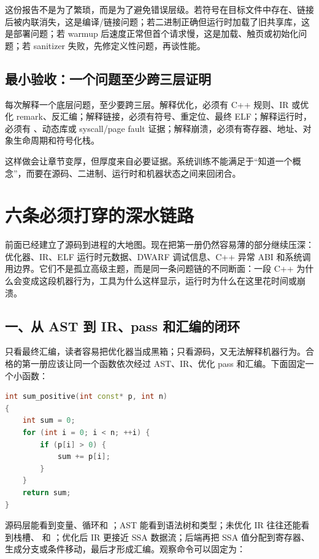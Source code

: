 这份报告不是为了繁琐，而是为了避免错误层级。若符号在目标文件中存在、链接后被内联消失，这是编译/链接问题；若二进制正确但运行时加载了旧共享库，这是部署问题；若 warmup 后速度正常但首个请求慢，这是加载、触页或初始化问题；若 sanitizer 失败，先修定义性问题，再谈性能。

\subsection{最小验收：一个问题至少跨三层证明}

每次解释一个底层问题，至少要跨三层。解释优化，必须有 C++ 规则、IR 或优化 remark、反汇编；解释链接，必须有符号、重定位、最终 ELF；解释运行时，必须有 、动态库或 syscall/page fault 证据；解释崩溃，必须有寄存器、地址、对象生命周期和符号化栈。

这样做会让章节变厚，但厚度来自必要证据。系统训练不能满足于“知道一个概念”，而要在源码、二进制、运行时和机器状态之间来回闭合。

\section{六条必须打穿的深水链路}

前面已经建立了源码到进程的大地图。现在把第一册仍然容易薄的部分继续压深：优化器、IR、ELF 运行时元数据、DWARF 调试信息、C++ 异常 ABI 和系统调用边界。它们不是孤立高级主题，而是同一条问题链的不同断面：一段 C++ 为什么会变成这段机器行为，工具为什么这样显示，运行时为什么在这里花时间或崩溃。

\subsection{一、从 AST 到 IR、pass 和汇编的闭环}

只看最终汇编，读者容易把优化器当成黑箱；只看源码，又无法解释机器行为。合格的第一册应该让同一个函数依次经过 AST、IR、优化 pass 和汇编。下面固定一个小函数：

\begin{lstlisting}[language=C++,caption={用于观察优化链路的小函数}]
int sum_positive(int const* p, int n)
{
    int sum = 0;
    for (int i = 0; i < n; ++i) {
        if (p[i] > 0) {
            sum += p[i];
        }
    }
    return sum;
}
\end{lstlisting}

源码层能看到变量、循环和 ；AST 能看到语法树和类型；未优化 IR 往往还能看到栈槽、 和 ；优化后 IR 更接近 SSA 数据流；后端再把 SSA 值分配到寄存器、生成分支或条件移动，最后才形成汇编。观察命令可以固定为：

